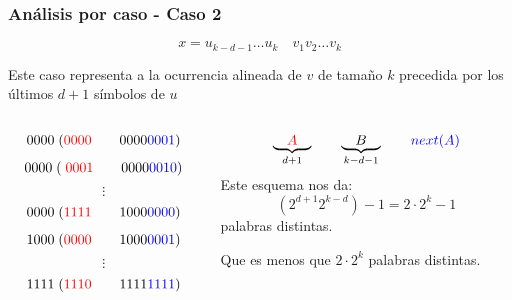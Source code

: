 \documentclass[10pt,mathserif]{beamer}%
\begin{document}
\begin{frame}
  \frametitle{Análisis por caso - Caso 2}
  $$ x = u_{k-d-1} \dots u_k \quad v_1 v_2 \dots v_k$$

  Este caso representa a la ocurrencia alineada de $v$ de tamaño $k$ precedida por los últimos $d+1$ símbolos de $u$
  
  \begin{columns}
    \begin{column}{0.5\textwidth}
      $$0000 \; (\textcolor{red}{0000} \qquad 0000\textcolor{blue}{0001})$$
      $$0000 \; (\; \textcolor{red}{0001} \qquad 0000\textcolor{blue}{0010})$$
      $$\vdots$$
      $$0000 \; (\textcolor{red}{1111} \qquad 1000\textcolor{blue}{0000})$$
      $$1000 \; (\textcolor{red}{0000} \qquad 1000\textcolor{blue}{0001})$$
      $$\vdots$$
      $$1111 \; (\textcolor{red}{1110} \qquad 1111\textcolor{blue}{1111})$$
    \end{column}
    \begin{column}{0.5\textwidth}  %
          \pause
          $$\underbrace{\quad \textcolor{red}{A} \quad }_{d +1} \qquad \underbrace{\quad B \quad }_{k - d - 1}  \qquad \textcolor{blue}{next(A)}$$
          \pause
          Este esquema nos da:
          $$(2^{d + 1} 2^{k-d})-1=  2 \cdot 2^k - 1$$
          palabras distintas.

          Que es menos que  $2 \cdot 2^k$ palabras distintas.
    \end{column}
    \end{columns}
\end{frame} 
\end{document}
